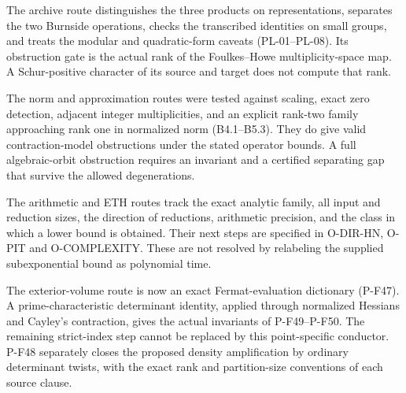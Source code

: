 \documentclass[11pt,a4paper]{article}
\begin{document}
The archive route distinguishes the three products on representations,
separates the two Burnside operations, checks the transcribed identities
on small groups, and treats the modular and quadratic-form caveats
(PL-01--PL-08). Its obstruction gate is the actual rank of the
Foulkes--Howe multiplicity-space map. A Schur-positive character of its
source and target does not compute that rank.

The norm and approximation routes were tested against scaling, exact
zero detection, adjacent integer multiplicities, and an explicit rank-two
family approaching rank one in normalized norm (B4.1--B5.3). They do give
valid contraction-model obstructions under the stated operator bounds.
A full algebraic-orbit obstruction requires an invariant and a certified
separating gap that survive the allowed degenerations.

The arithmetic and ETH routes track the exact analytic family, all input
and reduction sizes, the direction of reductions, arithmetic precision,
and the class in which a lower bound is obtained. Their next steps are
specified in O-DIR-HN, O-PIT and O-COMPLEXITY. These are not resolved by
relabeling the supplied subexponential bound as polynomial time.

The exterior-volume route is now an exact Fermat-evaluation
dictionary (P-F47). A prime-characteristic determinant identity,
applied through normalized Hessians and Cayley's contraction,
gives the actual invariants of P-F49--P-F50. The remaining
strict-index step cannot be replaced by this point-specific
conductor. P-F48 separately closes the proposed density
amplification by ordinary determinant twists, with the exact
rank and partition-size conventions of each source clause.
\end{document}
